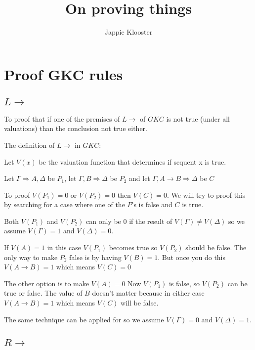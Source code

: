 \documentclass{article}
\newenvironment{scprooftree}[1]%
{\gdef\scalefactor{#1}\begin{center}\proofSkipAmount \leavevmode}%
{\scalebox{\scalefactor}{\DisplayProof}\proofSkipAmount \end{center} }
\begin{document}
\author{Jappie Klooster}
\title{On proving things}
\maketitle

\section{Proof GKC rules}
\subsection{$L\to$}
To proof that if one of the premises of $L\to$ of $GKC$ is not true
(under all valuations) than the conclusion not true either.

The definition of $L\to$ in $GKC$:

\begin{scprooftree}{1}
\end{scprooftree}

Let $V(x)$ be the valuation function that determines if sequent x
is true.

Let $\Gamma \Rightarrow A, \Delta$ be $P_1$,
let $\Gamma, B \Rightarrow \Delta$ be $P_2$ and
let $\Gamma, A \to B \Rightarrow \Delta$ be $C$

To proof $V(P_1) = 0$ or
$V(P_2) = 0$ then
$V(C) = 0$. We will try to proof this by searching for a case
where one of the $P$'s is false and $C$ is true.

Both $V(P_1)$ and $V(P_2)$ can only be 0 if the result of
$V(\Gamma) \not= V(\Delta)$
so we assume $V(\Gamma) = 1$ and $V(\Delta) = 0$.

If $V(A) = 1$ in this case $V(P_1)$ becomes true so $V(P_2)$ should be false.
The only way to make $P_2$ false is by having $V(B) = 1$.
But once you do this $V(A \to B) = 1$ which means $V(C) = 0$

The other option is to make $V(A) = 0$ Now $V(P_1)$ is false, so $V(P_2)$ can
be true or false. The value of $B$ doesn't matter because in either case
$V(A \to B) = 1$ which means $V(C)$ will be false.

The same technique can be applied for so we assume $V(\Gamma) = 0$ and $V(\Delta) = 1$.

\subsection{$R\to$}
\end{document}
